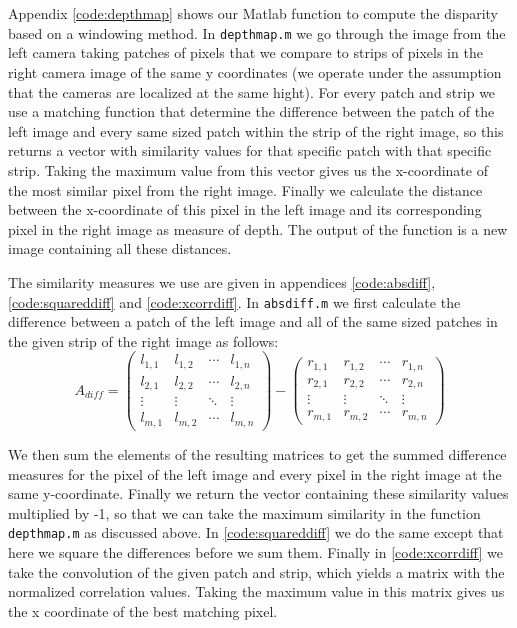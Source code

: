 \documentclass{article}
\begin{document}
\section{}
Appendix \ref{code:depthmap} shows our Matlab function to compute the disparity based on a windowing method. In \texttt{depthmap.m} we go through the image from the left camera taking patches of pixels that we compare to strips of pixels in the right camera image of the same y coordinates (we operate under the assumption that the cameras are localized at the same hight). For every patch and strip we use a matching function that determine the difference between the patch of the left image and every same sized patch within the strip of the right image, so this returns a vector with similarity values for that specific patch with that specific strip. Taking the maximum value from this vector gives us the x-coordinate of the most similar pixel from the right image. Finally we calculate the distance between the x-coordinate of this pixel in the left image and its corresponding pixel in the right image as measure of depth. The output of the function is a new image containing all these distances.

The similarity measures we use are given in appendices \ref{code:absdiff}, \ref{code:squareddiff} and \ref{code:xcorrdiff}. In \texttt{absdiff.m} we first calculate the difference between a patch of the left image and all of the same sized patches in the given strip of the right image as follows:
\begin{equation}
A_{diff} = 
 \begin{pmatrix}
  l_{1,1} & l_{1,2} & \cdots & l_{1,n} \\
  l_{2,1} & l_{2,2} & \cdots & l_{2,n} \\
  \vdots  & \vdots  & \ddots & \vdots  \\
  l_{m,1} & l_{m,2} & \cdots & l_{m,n} 
 \end{pmatrix}
-
 \begin{pmatrix}
  r_{1,1} & r_{1,2} & \cdots & r_{1,n} \\
  r_{2,1} & r_{2,2} & \cdots & r_{2,n} \\
  \vdots  & \vdots  & \ddots & \vdots  \\
  r_{m,1} & r_{m,2} & \cdots & r_{m,n} 
 \end{pmatrix} 
\end{equation}

We then sum the elements of the resulting matrices to get the summed difference measures for the pixel of the left image and every pixel in the right image at the same y-coordinate. Finally we return the vector containing these similarity values multiplied by -1, so that we can take the maximum similarity in the function \texttt{depthmap.m} as discussed above. In \ref{code:squareddiff} we do the same except that here we square the differences before we sum them.
Finally in \ref{code:xcorrdiff} we take the convolution of the given patch and strip, which yields a matrix with the normalized correlation values. Taking the maximum value in this matrix gives us the x coordinate of the best matching pixel.
\end{document}
